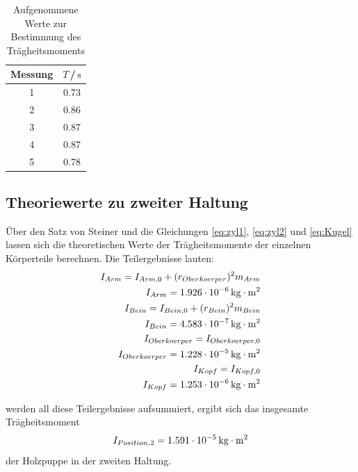 \begin{table}[H]
\normalsize

\centering
{}
\begin{tabular}{c c}
\toprule
    Messung  & $T$\,/\,$\si{\second}$ \\
    \midrule

1  &   0.73   \\
2  &   0.86   \\
3  &   0.87   \\
4  &   0.87   \\
5  &   0.78   \\

    \bottomrule
\end{tabular}
\caption{Aufgenommene Werte zur Bestimmung des Trägheitsmoments}
\label{tab:euler}
\end{table}



\subsection{Theoriewerte zu zweiter Haltung}

Über den Satz von Steiner und die Gleichungen \ref{eq:zyl1}, \ref{eq:zyl2} und \ref{eq:Kugel} 
lassen sich die theoretischen Werte der Trägheitsmomente der einzelnen
Körperteile berechnen. Die Teilergebnisse lauten:
\begin{align}
    I_{Arm} = I_{Arm,0} + (r_{Oberkoerper})^2 m_{Arm} \nonumber \\
    I_{Arm} = 1.926 \cdot 10^{-6}\,\si[inter-unit-product=\cdot]{\kilo\gram\meter\squared}\nonumber \\
    I_{Bein} = I_{Bein,0} + (r_{Bein})^2 m_{Bein} \nonumber \\
    I_{Bein} = 4.583 \cdot 10^{-7}\,\si[inter-unit-product=\cdot]{\kilo\gram\meter\squared}\nonumber \\
    I_{Oberkoerper} = I_{Oberkoerper,0}\nonumber \\
    I_{Oberkoerper} = 1.228 \cdot 10^{-5}\,\si[inter-unit-product=\cdot]{\kilo\gram\meter\squared}\nonumber \\
    I_{Kopf} = I_{Kopf,0}\nonumber \\
    I_{Kopf} = 1.253 \cdot 10^{-6}\,\si[inter-unit-product=\cdot]{\kilo\gram\meter\squared}\nonumber \\
\end{align}

\noindent
werden all diese Teilergebnisse aufsummiert, ergibt sich das insgesamte Trägheitsmoment 
\begin{equation}
    I_{Position,2} = 1.591 \cdot 10^{-5}\,\si[inter-unit-product=\cdot]{\kilo\gram\meter\squared} 
\end{equation}
der Holzpuppe in der zweiten
Haltung.



